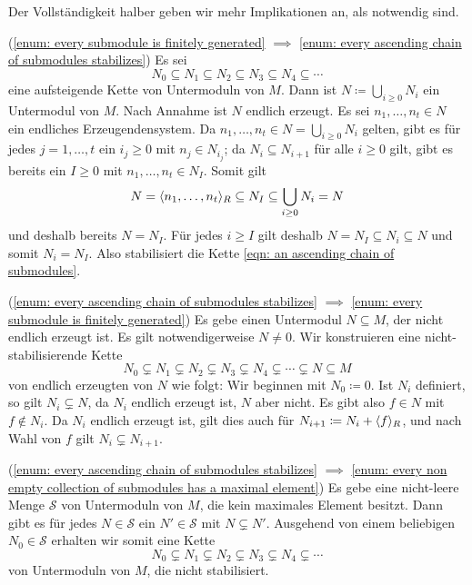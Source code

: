 \begin{solution}
  Der Vollständigkeit halber geben wir mehr Implikationen an, als notwendig sind.
  
  (\ref{enum: every submodule is finitely generated}
  $\implies$
  \ref{enum: every ascending chain of submodules stabilizes})
  Es sei
  \begin{equation}
    \label{eqn: an ascending chain of submodules}
              N_0
    \subseteq N_1
    \subseteq N_2
    \subseteq N_3
    \subseteq N_4
    \subseteq \dotsb
  \end{equation}
  eine aufsteigende Kette von Untermoduln von $M$.
  Dann ist $N \coloneqq \bigcup_{i \geq 0} N_i$ ein Untermodul von $M$.
  Nach Annahme ist $N$ endlich erzeugt.
  Es sei $n_1, \dotsc, n_t \in N$ ein endliches Erzeugendensystem.
  Da $n_1, \dotsc, n_t \in N = \bigcup_{i \geq 0} N_i$ gelten, gibt es für jedes $j = 1, \dotsc, t$ ein $i_j \geq 0$ mit $n_j \in N_{i_j}$;
  da $N_i \subseteq N_{i+1}$ für alle $i \geq 0$ gilt, gibt es bereits ein $I \geq 0$ mit $n_1, \dotsc, n_t \in N_I$.
  Somit gilt
  \[
              N
    =         \langle n_1, \dotsc, n_t\rangle_R
    \subseteq N_I
    \subseteq \bigcup_{i \geq 0} N_i
    =         N
  \]
  und deshalb bereits $N = N_I$.
  Für jedes $i \geq I$ gilt deshalb $N = N_I \subseteq N_i \subseteq N$ und somit $N_i = N_I$.
  Also stabilisiert die Kette \eqref{eqn: an ascending chain of submodules}.
  
  (\ref{enum: every ascending chain of submodules stabilizes}
  $\implies$
  \ref{enum: every submodule is finitely generated})
  Es gebe einen Untermodul $N \subseteq M$, der nicht endlich erzeugt ist.
  Es gilt notwendigerweise $N \neq 0$.
  Wir konstruieren eine nicht-stabilisierende Kette
  \[
                N_0
    \subsetneq  N_1
    \subsetneq  N_2
    \subsetneq  N_3
    \subsetneq  N_4
    \subsetneq \dotsb
    \subsetneq  N
    \subseteq   M
  \]
  von endlich erzeugten von $N$ wie folgt:
  Wir beginnen mit $N_0 \coloneqq 0$.
  Ist $N_i$ definiert, so gilt $N_i \subsetneq N$, da $N_i$ endlich erzeugt ist, $N$ aber nicht. 
  Es gibt also $f \in N$ mit $f \notin N_i$.
  Da $N_i$ endlich erzeugt ist, gilt dies auch für $N_{i+1} \coloneqq N_i + \langle f\rangle_R$, und nach Wahl von $f$ gilt $N_i \subsetneq N_{i+1}$.
  
  
  (\ref{enum: every ascending chain of submodules stabilizes}
  $\implies$
  \ref{enum: every non empty collection of submodules has a maximal element})
  Es gebe eine nicht-leere Menge $\mathcal{S}$ von Untermoduln von $M$, die kein maximales Element besitzt.
  Dann gibt es für jedes $N \in \mathcal{S}$ ein $N' \in \mathcal{S}$ mit $N \subsetneq N'$.
  Ausgehend von einem beliebigen $N_0 \in \mathcal{S}$ erhalten wir somit eine Kette
  \[
                N_0
    \subsetneq  N_1
    \subsetneq  N_2
    \subsetneq  N_3
    \subsetneq  N_4
    \subsetneq \dotsb
  \]
  von Untermoduln von $M$, die nicht stabilisiert.
  

\end{solution}
